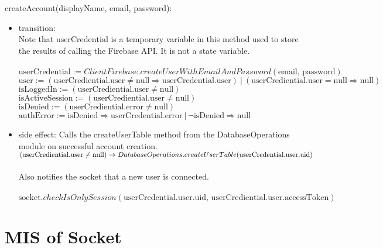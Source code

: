 \documentclass[12pt, titlepage]{article}
\begin{document}
\noindent createAccount(displayName, email, password):
\begin{itemize}
\item transition: \\ 
Note that $\text{userCredential}$ is a temporary variable in this method used to store the results of calling the Firebase API. It is not a state variable. \\ \\
$\text{userCredential} :=  ClientFirebase.createUserWithEmailAndPassword(\text{email, password})$ \\

$\text{user} := (\text{userCrediential.user} \neq \text{null} \Rightarrow \text{userCredential.user}) \ | \ (\text{userCrediential.user} = \text{null} \Rightarrow \text{null})$ \\

$\text{isLoggedIn} := (\text{userCrediential.user} \neq \text{null})$ \\

$\text{isActiveSession} := (\text{userCrediential.user} \neq \text{null})$ \\

$\text{isDenied} := (\text{userCrediential.error} \neq \text{null})$ \\

$\text{authError} := \text{isDenied} \Rightarrow \text{userCredential.error} \ | \ \lnot \text{isDenied} \Rightarrow \text{null} $

\item side effect: Calls the createUserTable method from the DatabaseOperations module on successful account creation. \\

$(\text{userCrediential.user} \neq \text{null}) \Rightarrow \\
DatabaseOperations.createUserTable(\text{userCredential.user.uid})$ \\
\\ Also notifies the socket that a new user is connected. \\ 
\\ $\text{socket}.checkIsOnlySession(\text{userCredential.user.uid, userCrediential.user.accessToken})$

\end{itemize}

  
\medskip
\newpage
\section{MIS of Socket} \label{Socket} 
\end{document}
